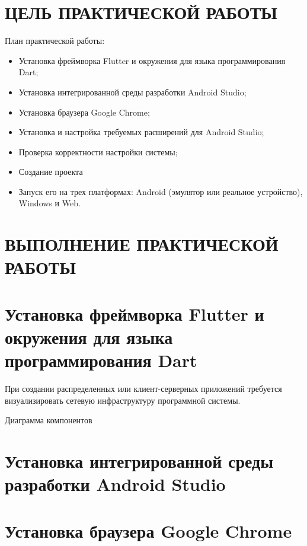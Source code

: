 \section*{ЦЕЛЬ ПРАКТИЧЕСКОЙ РАБОТЫ}

План практической работы:
\begin{itemize}
	\item Установка фреймворка Flutter
		и окружения для языка программирования Dart;
	\item Установка интегрированной среды разработки Android Studio;
	\item Установка браузера Google Chrome;
	\item Установка и настройка требуемых расширений для Android Studio;
	\item Проверка корректности настройки системы;
	\item Создание проекта
	\item Запуск его на трех платформах:
		Android (эмулятор или реальное устройство), Windows и Web.
\end{itemize}

\clearpage

\section*{ВЫПОЛНЕНИЕ ПРАКТИЧЕСКОЙ РАБОТЫ}
\section{Установка фреймворка Flutter и окружения для языка программирования Dart}
При создании распределенных или клиент-серверных приложений
требуется визуализировать сетевую инфраструктуру программной системы.\par

\begin{image}
	\caption{Диаграмма компонентов}
	\label{fig:deployments}
\end{image}


\section{Установка интегрированной среды разработки Android Studio}
\section{Установка браузера Google Chrome}
